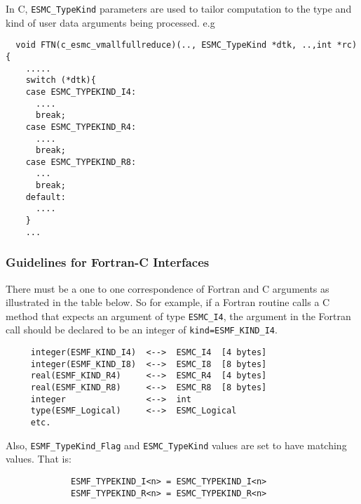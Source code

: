 In C, {\tt ESMC\_TypeKind} parameters are used to tailor computation to the type and kind of user data arguments being processed. e.g
\begin{verbatim}
  void FTN(c_esmc_vmallfullreduce)(.., ESMC_TypeKind *dtk, ..,int *rc){
    .....      
    switch (*dtk){
    case ESMC_TYPEKIND_I4:
      ....
      break;
    case ESMC_TYPEKIND_R4:
      ....
      break;
    case ESMC_TYPEKIND_R8:
      ...         
      break;
    default:
      ....
    }
    ...
\end{verbatim}

\subsubsection{Guidelines for Fortran-C Interfaces}

There must be a one to one correspondence of Fortran and C arguments as illustrated in the table below. So for example, if a Fortran routine calls a C method that expects an argument of type {\tt ESMC\_I4}, the argument in the Fortran call should be declared to be an integer of {\tt kind=ESMF\_KIND\_I4}.
\begin{verbatim}
     integer(ESMF_KIND_I4)  <-->  ESMC_I4  [4 bytes]
     integer(ESMF_KIND_I8)  <-->  ESMC_I8  [8 bytes]
     real(ESMF_KIND_R4)     <-->  ESMC_R4  [4 bytes]
     real(ESMF_KIND_R8)     <-->  ESMC_R8  [8 bytes]
     integer                <-->  int
     type(ESMF_Logical)     <-->  ESMC_Logical
     etc.
\end{verbatim}
Also, {\tt ESMF\_TypeKind\_Flag} and {\tt ESMC\_TypeKind} values are set to have matching values. That is:
\begin{verbatim}
             ESMF_TYPEKIND_I<n> = ESMC_TYPEKIND_I<n>
             ESMF_TYPEKIND_R<n> = ESMC_TYPEKIND_R<n>
\end{verbatim}
















